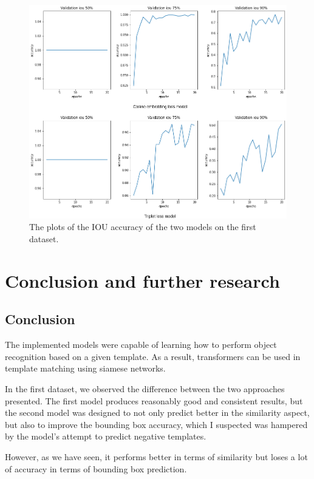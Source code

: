 \documentclass{report}[12pt, a4paper]
\begin{document}
\begin{figure}[htp]
    \centering
    \includegraphics[width=15cm]{iou_accuracies_model_comparison}
    \caption{The plots of the IOU accuracy of the two models on the first dataset.}
    \label{fig:iou_accuracies_model_comparison}
\end{figure}

\chapter{Conclusion and further research}

\section{Conclusion}

The implemented models were capable of learning how to perform object recognition based on a given template. As a result, transformers can be used in template matching using siamese networks.

In the first dataset, we observed the difference between the two approaches presented. The first model produces reasonably good and consistent results, but the second model was designed to not only predict better in the similarity aspect, but also to improve the bounding box accuracy, which I suspected was hampered by the model's attempt to predict negative templates. 

However, as we have seen, it performs better in terms of similarity but loses a lot of accuracy in terms of bounding box prediction.
\end{document}
